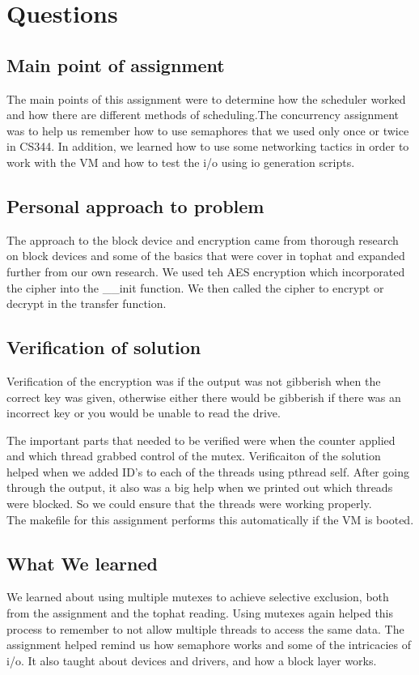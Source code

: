\documentclass[letterpaper,10pt,titlepage]{article}
\begin{document}
\section{Questions}
\subsection{Main point of assignment}
The main points of this assignment were to determine how the scheduler worked and how there are different methods of scheduling.The concurrency assignment was to help us remember how to use semaphores that we used only once or twice in CS344.  In addition, we learned how to use some networking tactics in order to work with the VM and how to test the i/o using io generation scripts.

\subsection{Personal approach to problem}
The approach to the block device and encryption came from thorough research on block devices and some of the basics that were cover in tophat and expanded further from our own research.  We used teh AES encryption which incorporated the cipher into the \_\_init function.  We then called the cipher to encrypt or decrypt in the transfer function.

\subsection{Verification of solution}
Verification of the encryption was if the output was not gibberish when the correct key was given, otherwise either there would be gibberish if there was an incorrect key or you would be unable to read the drive.

The important parts that needed to be verified were when the counter applied and which thread grabbed control of the mutex.  Verificaiton of the solution helped when we added ID's to each of the threads using pthread self.  After going through the output, it also was a big help when we printed out which threads were blocked. So we could ensure that the threads were working properly.\\

The makefile for this assignment performs this automatically if the VM is booted.


\subsection{What We learned}
We learned about using multiple mutexes to achieve selective exclusion, both from the assignment and the tophat reading. Using mutexes again helped this process to remember to not allow multiple threads to access the same data.  The assignment helped remind us how semaphore works and some of the intricacies of i/o.  It also taught about devices and drivers, and how a block layer works.
\end{document}

